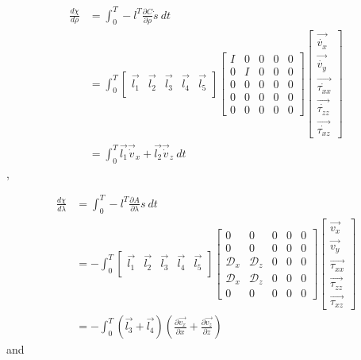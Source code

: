 \documentclass[fleqn,11pt]{SelfArx} %
\newcommand{\pder}[2][]{\frac{\partial#1}{\partial#2}}
\theoremstyle{definition}
\begin{document}
\begin{equation}
\begin{aligned}
\frac{d\chi}{d\rho} &= \int_0^T - l^T \pder[C]{\rho} \dot s\ dt \\
&=\int_0^T
 \begin{bmatrix}
\vec{l_1}&\vec{l_2}&\vec{l_3} &\vec{l_4} & \vec{l_5}\\
\end{bmatrix}
 \begin{bmatrix}
I & 0 & 0 & 0 & 0 \\
0  & I & 0&0&0\\
0 & 0 & 0&0&0\\
0&0&0&0&0\\
0&0&0&0&0
\end{bmatrix}
\begin{bmatrix}
\vec{\dot{v_x}}\\
\vec{\dot{v_y}}\\
\vec{\dot{\tau_{xx}}}\\
\vec{\dot{\tau_{zz}}}\\
\vec{\dot{\tau_{xz}}}
\end{bmatrix} \\
&=\int_0^T \vec{l_1}\vec{\dot{v}}_x + \vec{l_2}\vec{\dot{v}}_z \ dt 
\end{aligned}
\end{equation},

\begin{equation}
\begin{aligned}
\frac{d\chi}{d\lambda} &= \int_0^T - l^T \pder[A]{\lambda} s\ dt \\
&=-\int_0^T
 \begin{bmatrix}
\vec{l_1}&\vec{l_2}&\vec{l_3} &\vec{l_4} & \vec{l_5}\\
\end{bmatrix}
 \begin{bmatrix}
0 & 0 & 0 & 0 & 0 \\
0  & 0 & 0&0&0\\
\mathcal{D}_x & \mathcal{D}_z & 0&0&0\\
\mathcal{D}_x&\mathcal{D}_z&0&0&0\\
0&0&0&0&0
\end{bmatrix}
\begin{bmatrix}
\vec{{v_x}}\\
\vec{{v_y}}\\
\vec{{\tau_{xx}}}\\
\vec{{\tau_{zz}}}\\
\vec{{\tau_{xz}}}
\end{bmatrix} \\
&=-\int_0^T \left(\vec{l_3} + \vec{l_4}\right) \left(\pder[\vec{v_x}]{x} + \pder[\vec{v_z}]{z}\right) 
\end{aligned}
\end{equation} and
\end{document}
